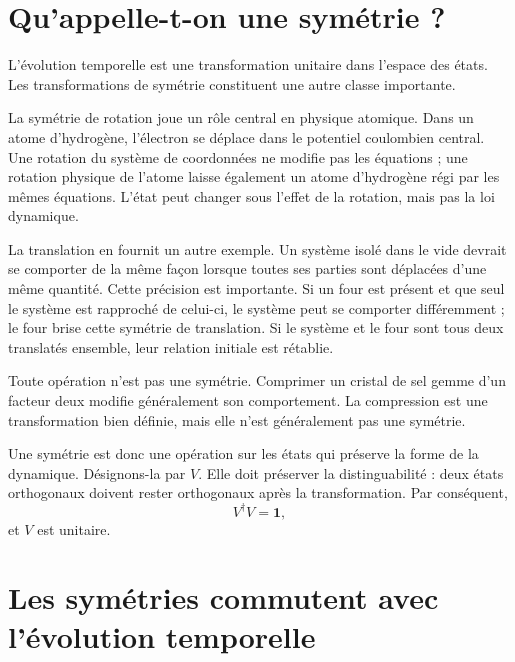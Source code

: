 \section{Qu’appelle-t-on une symétrie ?}

L’évolution temporelle est une transformation unitaire dans l’espace des états. Les transformations de symétrie constituent une autre classe importante.

La symétrie de rotation joue un rôle central en physique atomique. Dans un atome d’hydrogène, l’électron se déplace dans le potentiel coulombien central. Une rotation du système de coordonnées ne modifie pas les équations ; une rotation physique de l’atome laisse également un atome d’hydrogène régi par les mêmes équations. L’état peut changer sous l’effet de la rotation, mais pas la loi dynamique.

La translation en fournit un autre exemple. Un système isolé dans le vide devrait se comporter de la même façon lorsque toutes ses parties sont déplacées d’une même quantité. Cette précision est importante. Si un four est présent et que seul le système est rapproché de celui-ci, le système peut se comporter différemment ; le four brise cette symétrie de translation. Si le système et le four sont tous deux translatés ensemble, leur relation initiale est rétablie.

Toute opération n’est pas une symétrie. Comprimer un cristal de sel gemme d’un facteur deux modifie généralement son comportement. La compression est une transformation bien définie, mais elle n’est généralement pas une symétrie.

Une symétrie est donc une opération sur les états qui préserve la forme de la dynamique. Désignons-la par \(V\). Elle doit préserver la distinguabilité : deux états orthogonaux doivent rester orthogonaux après la transformation. Par conséquent,
\begin{equation}
V^\dagger V=\mathbf 1,
\end{equation}
et \(V\) est unitaire.

\section{Les symétries commutent avec l’évolution temporelle}

